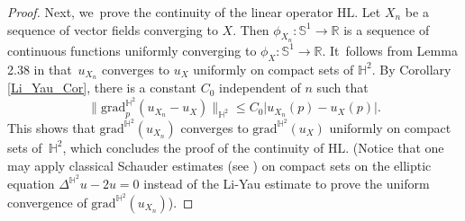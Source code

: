 \documentclass[11pt]{article}
\theoremstyle{plain}
\theoremstyle{definition}
\newcommand{\grad}{\mathrm{grad}^{\mathbb{H}^2}}
\begin{document}
\begin{proof}
Next, we~prove the continuity of the linear operator $\mathrm{HL}$. Let $X_n$ be a sequence of vector fields converging to $X$. Then $\phi_{X_n}:\mathbb{S}^1 \to \mathbb{R}$ is a sequence of continuous functions uniformly converging to $\phi_X:\mathbb{S}^1 \to \mathbb{R}$. It~follows from Lemma 2.38 in \cite{barbotfillastre} that~$u_{X_n}$ converges to $u_X$ uniformly on compact sets of $\mathbb{H}^2$. By Corollary \ref{Li_Yau_Cor}, there is a constant $C_0$ independent of $n$ such that
\[
\lVert \grad_p(u_{X_n}-u_X)\rVert_{\mathbb{H}^2}\leq C_0\lvert u_{X_n}(p)-u_X(p)\rvert.
\]
This shows that $\grad(u_{X_n})$ converges to $\grad(u_X)$ uniformly on compact sets of~$\mathbb{H}^2$, which concludes the proof of the continuity of $\mathrm{HL}$. (Notice that one may apply classical Schauder estimates (see \cite{PDE_Book}) on compact sets on the elliptic equation $\Delta^{\mathbb{H}^2} u - 2u=0$ instead of the Li-Yau estimate to prove the uniform convergence of $\grad(u_{X_n})$).


\end{proof}
\end{document}

